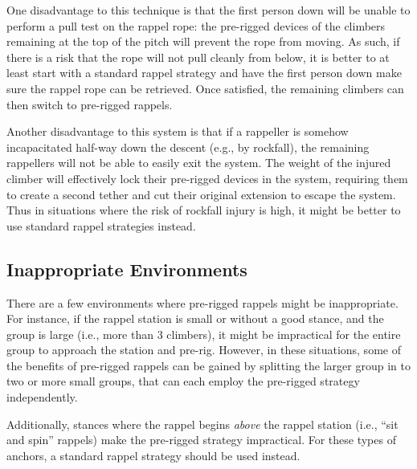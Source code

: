\documentclass[nonacm,acmtog]{acmart}
\begin{document}
  One disadvantage to this technique is that the first person down will be
  unable to perform a pull test on the rappel rope: the pre-rigged devices of
  the climbers remaining at the top of the pitch will prevent the rope from
  moving.  As such, if there is a risk that the rope will not pull cleanly from
  below, it is better to at least start with a standard rappel strategy and
  have the first person down make sure the rappel rope can be retrieved.  Once
  satisfied, the remaining climbers can then switch to pre-rigged rappels.

  Another disadvantage to this system is that if a rappeller is somehow
  incapacitated half-way down the descent (e.g., by rockfall), the remaining
  rappellers will not be able to easily exit the system.  The weight of the
  injured climber will effectively lock their pre-rigged devices in the system,
  requiring them to create a second tether and cut their original extension to
  escape the system.  Thus in situations where the risk of rockfall injury is
  high, it might be better to use standard rappel strategies instead.

\subsection{Inappropriate Environments}

   There are a few environments where pre-rigged rappels might be
   inappropriate.  For instance, if the rappel station is small or without a
   good stance, and the group is large (i.e., more than 3 climbers), it might
   be impractical for the entire group to approach the station and pre-rig.
   However, in these situations, some of the benefits of pre-rigged rappels can
   be gained by splitting the larger group in to two or more small groups, that
   can each employ the pre-rigged strategy independently.

   Additionally, stances where the rappel begins {\em above} the rappel station
   (i.e., ``sit and spin'' rappels) make the pre-rigged strategy impractical.
   For these types of anchors, a standard rappel strategy should be used
   instead.
\end{document}
